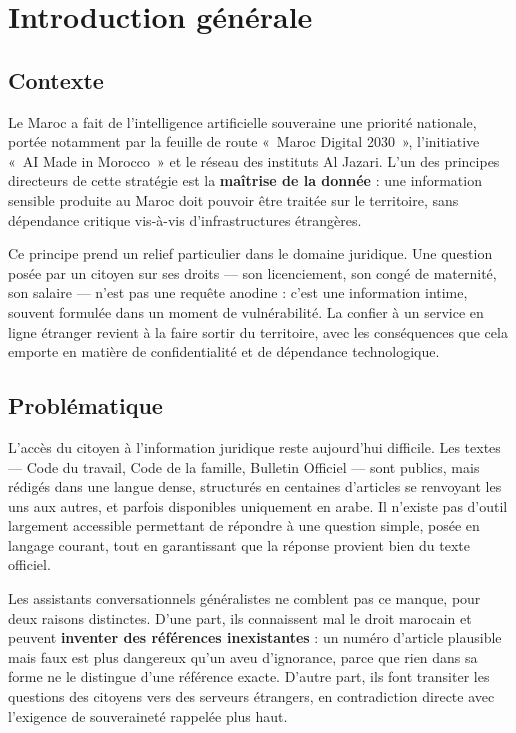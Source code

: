 \chapter*{Introduction générale}

\section*{Contexte}

Le Maroc a fait de l'intelligence artificielle souveraine une priorité nationale, portée
notamment par la feuille de route «~Maroc Digital 2030~», l'initiative «~AI Made in Morocco~» et
le réseau des instituts Al Jazari. L'un des principes directeurs de cette stratégie est la
\textbf{maîtrise de la donnée} : une information sensible produite au Maroc doit pouvoir être
traitée sur le territoire, sans dépendance critique vis-à-vis d'infrastructures étrangères.

Ce principe prend un relief particulier dans le domaine juridique. Une question posée par un
citoyen sur ses droits --- son licenciement, son congé de maternité, son salaire --- n'est pas
une requête anodine : c'est une information intime, souvent formulée dans un moment de
vulnérabilité. La confier à un service en ligne étranger revient à la faire sortir du territoire,
avec les conséquences que cela emporte en matière de confidentialité et de dépendance
technologique.

\section*{Problématique}

L'accès du citoyen à l'information juridique reste aujourd'hui difficile. Les textes --- Code du
travail, Code de la famille, Bulletin Officiel --- sont publics, mais rédigés dans une langue
dense, structurés en centaines d'articles se renvoyant les uns aux autres, et parfois disponibles
uniquement en arabe. Il n'existe pas d'outil largement accessible permettant de répondre à une
question simple, posée en langage courant, tout en garantissant que la réponse provient bien du
texte officiel.

Les assistants conversationnels généralistes ne comblent pas ce manque, pour deux raisons
distinctes. D'une part, ils connaissent mal le droit marocain et peuvent \textbf{inventer des
références inexistantes} : un numéro d'article plausible mais faux est plus dangereux qu'un aveu
d'ignorance, parce que rien dans sa forme ne le distingue d'une référence exacte. D'autre part,
ils font transiter les questions des citoyens vers des serveurs étrangers, en contradiction
directe avec l'exigence de souveraineté rappelée plus haut.

